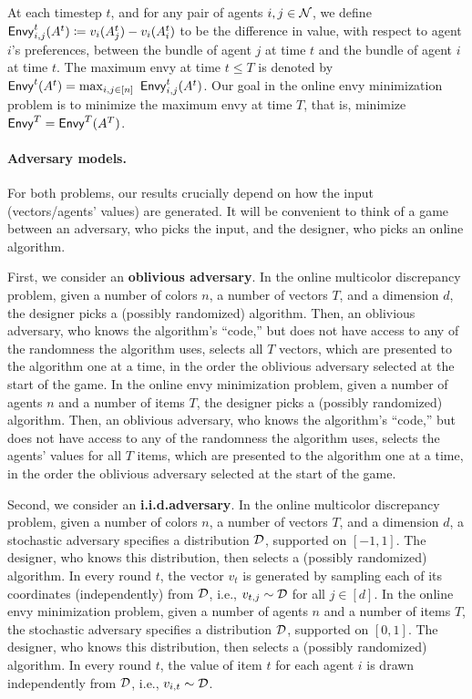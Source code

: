 At each timestep $t$, and for any pair of agents $i,j \in \mathcal{N}$, we define $\mathsf{Envy}^t_{i,j}(A^t) \coloneqq v_i(A^t_j) - v_i(A^t_i)$ to be the difference in value, with respect to agent $i$'s preferences, between the bundle of agent $j$ at time $t$ and the bundle of agent $i$ at time $t$. The maximum envy at time $t \leq T$ is denoted by $\mathsf{Envy}^t(A^t) = \max_{i,j \in [n]} \ \mathsf{Envy}^t_{i,j}(A^t)$. Our goal in the online envy minimization problem is to minimize the maximum envy at time $T$, that is, minimize $\mathsf{Envy}^T = \mathsf{Envy}^T(A^T)$. 

\paragraph{Adversary models.} 
For both problems, our results crucially depend on how the input (vectors/agents' values) are generated. It will be convenient to think of a game between an adversary, who picks the input, and the designer, who picks an online algorithm. 


First, we consider an \textbf{oblivious adversary}.
In the online multicolor discrepancy problem, given a number of colors $n$, a number of vectors $T$, and a dimension $d$, the designer picks a (possibly randomized) algorithm. Then, an oblivious adversary, who knows the algorithm's ``code,'' but does not have access to any of the randomness the algorithm uses, selects all $T$ vectors, which are presented to the algorithm one at a time, in the order the oblivious adversary selected at the start of the game.
In the online envy minimization problem, given a number of agents $n$ and a number of items $T$, the designer picks a (possibly randomized) algorithm. Then, an oblivious adversary, who knows the algorithm's ``code,'' but does not have access to any of the randomness the algorithm uses, selects the agents' values for all $T$ items, which are presented to the algorithm one at a time, in the order the oblivious adversary selected at the start of the game.
 

Second, we consider an \textbf{i.i.d.\@ adversary}.
In the online multicolor discrepancy problem, given a number of colors $n$, a number of vectors $T$, and a dimension $d$, a stochastic adversary specifies a distribution $\mathcal{D}$, supported on $[-1,1]$. The designer, who knows this distribution, then selects a (possibly randomized) algorithm. In every round $t$, the vector $v_t$ is generated by sampling each of its coordinates (independently) from $\mathcal{D}$, i.e., $v_{t,j} \sim \mathcal{D}$ for all $j \in [d]$. In the online envy minimization problem, given a number of agents $n$ and a number of items $T$, the stochastic adversary specifies a distribution $\mathcal{D}$, supported on $[0,1]$. The designer, who knows this distribution, then selects a (possibly randomized) algorithm. In every round $t$, the value of item $t$ for each agent $i$ is drawn independently from $\mathcal{D}$, i.e., $v_{i,t} \sim \mathcal{D}$.



